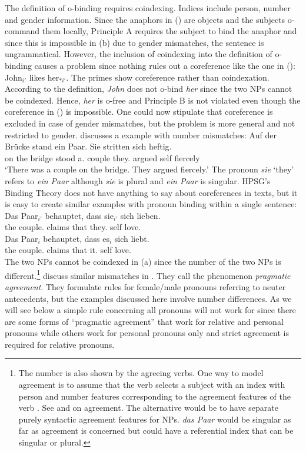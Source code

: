 \documentclass[output=paper
	        ,collection
	        ,collectionchapter
 	        ,biblatex
                ,babelshorthands
                ,newtxmath
                ,draftmode
                ,colorlinks, citecolor=brown
]{langscibook}
\begin{document}
The definition of o-binding requires coindexing. Indices include person, number and gender
information. Since the anaphors in () are objects and the subjects o-command them locally,
Principle A requires the subject to bind the anaphor and since this is impossible in (b) due
to gender mismatches, the sentence is ungrammatical.
\eal
{}
\zl
However, the inclusion of coindexing into the definition of o-binding causes a problem since nothing
rules out a coreference like the one in ():
\ea
\label{bsp-john-likes-her}
John$_{i'}$ likes her$_{*i'}$.
\z
The primes show coreference rather than coindexation. According to the definition, \emph{John}
does not o-bind \emph{her} since the two NPs cannot be coindexed. Hence, \emph{her} is o-free and
Principle B is not violated even though the coreference in () is impossible. One could now
stipulate that coreference is excluded in case of gender mismatches, but the problem is more general
and not restricted to gender. \citet[]{Eisenberg94a} discusses a  example with number mismatches:
\ea
\gll Auf der Brücke stand ein Paar. Sie stritten sich heftig.\\
     on the bridge stood a.\sg{} couple   they.\pl{} argued  self fiercely\\
\glt `There was a couple on the bridge. They argued fiercely.'
\z
The pronoun \emph{sie} `they' refers to \emph{ein Paar} although \emph{sie} is plural and \emph{ein
  Paar} is singular. HPSG's Binding Theory does not have anything to say about coreferences in
texts, but it is easy to create similar examples with pronoun binding within a single sentence:
\eal
\ex 
\gll Das Paar$_{i'}$ behauptet, dass sie$_{i'}$ sich lieben.\\
     the couple.\sg{} claims that they.\pl{} self love.\pl\\
\ex 
\gll Das Paar$_{i}$ behauptet, dass es$_{i}$ sich liebt.\\
     the couple.\sg{} claims that it.\sg{} self love.\sg\\
\zl
The two NPs cannot be coindexed in (a) since the number of the two NPs is
different.\footnote{
  The number is also shown by the agreeing verbs. One way to model agreement is to assume that the
  verb selects a subject with an index with person and number features corresponding to the
  agreement features of the verb \citep[Section~2.4.2]{ps2}. See  and  on
  agreement. The alternative would be to have separate purely syntactic agreement features for
  NPs. \emph{das Paar} would be singular as far as agreement is concerned but could have a
  referential index that can be singular or plural.%
}
\citet[Section~9.2.1]{WZ2003a} discuss similar mismatches in . They call the phenomenon
\emph{pragmatic agreement}. They formulate rules for female/male pronouns referring to neuter
antecedents, but the examples discussed here involve number differences. As we will see below a
simple rule concerning all pronouns will not work for  since there are some forms of
``pragmatic agreement'' that work for relative and personal pronouns while others work for personal
pronouns only and strict agreement is required for relative pronouns.
\end{document}
